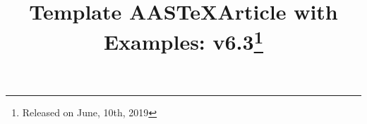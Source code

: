 \documentclass{aastex63}
\newcommand\aastex{AAS\TeX}
\begin{document}
\title{Template \aastex Article with Examples: 
v6.3\footnote{Released on June, 10th, 2019}}


\end{document}

